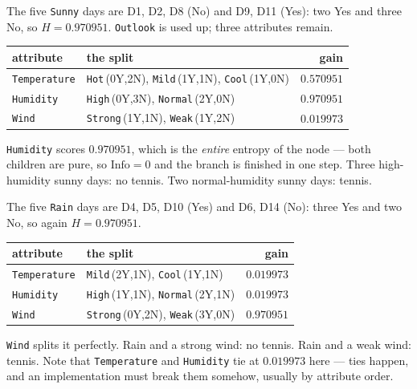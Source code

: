 \documentclass[11pt]{article}
\begin{document}
\begin{worked}
The five \texttt{Sunny} days are D1, D2, D8 (No) and D9, D11 (Yes): two Yes
and three No, so $H = 0.970951$. \texttt{Outlook} is used up; three attributes
remain.
\begin{center}
\begin{tabular}{@{}llr@{}}
\toprule
attribute & the split & gain\\
\midrule
\texttt{Temperature} & \texttt{Hot}\,(0Y,2N), \texttt{Mild}\,(1Y,1N),
  \texttt{Cool}\,(1Y,0N) & $0.570951$\\
\texttt{Humidity} & \texttt{High}\,(0Y,3N), \texttt{Normal}\,(2Y,0N) &
  $\mathbf{0.970951}$\\
\texttt{Wind} & \texttt{Strong}\,(1Y,1N), \texttt{Weak}\,(1Y,2N) & $0.019973$\\
\bottomrule
\end{tabular}
\end{center}
\texttt{Humidity} scores $0.970951$, which is the \emph{entire} entropy of the
node --- both children are pure, so $\mathrm{Info} = 0$ and the branch is
finished in one step. Three high-humidity sunny days: no tennis. Two
normal-humidity sunny days: tennis.
\end{worked}

\begin{worked}
The five \texttt{Rain} days are D4, D5, D10 (Yes) and D6, D14 (No): three Yes
and two No, so again $H = 0.970951$.
\begin{center}
\begin{tabular}{@{}llr@{}}
\toprule
attribute & the split & gain\\
\midrule
\texttt{Temperature} & \texttt{Mild}\,(2Y,1N), \texttt{Cool}\,(1Y,1N) &
  $0.019973$\\
\texttt{Humidity} & \texttt{High}\,(1Y,1N), \texttt{Normal}\,(2Y,1N) &
  $0.019973$\\
\texttt{Wind} & \texttt{Strong}\,(0Y,2N), \texttt{Weak}\,(3Y,0N) &
  $\mathbf{0.970951}$\\
\bottomrule
\end{tabular}
\end{center}
\texttt{Wind} splits it perfectly. Rain and a strong wind: no tennis. Rain and
a weak wind: tennis. Note that \texttt{Temperature} and \texttt{Humidity} tie
at $0.019973$ here --- ties happen, and an implementation must break them
somehow, usually by attribute order.
\end{worked}
\end{document}
